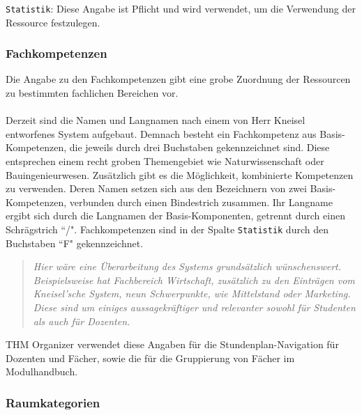 \noindent
\texttt{Statistik}: Diese Angabe ist Pflicht und wird verwendet, um die Verwendung der Ressource festzulegen.\\

\vspace{9pt}

\subsubsection{Fachkompetenzen}
\label{subsec:fachkompetenzen}

Die Angabe zu den Fachkompetenzen gibt eine grobe Zuordnung der Ressourcen zu bestimmten fachlichen Bereichen vor.\\
\\
Derzeit sind die Namen und Langnamen nach einem von Herr Kneisel entworfenes System aufgebaut. Demnach besteht ein Fachkompetenz aus Basis-Kompetenzen, die jeweils durch drei Buchstaben gekennzeichnet sind. Diese entsprechen einem recht groben Themengebiet wie Naturwissenschaft oder Bauingenieurwesen. Zusätzlich gibt es die Möglichkeit, kombinierte Kompetenzen zu verwenden. Deren Namen setzen sich aus den Bezeichnern von zwei Basis-Kompetenzen, verbunden durch einen Bindestrich zusammen. Ihr Langname ergibt sich durch die Langnamen der Basis-Komponenten, getrennt durch einen Schrägstrich ``/". Fachkompetenzen sind in der Spalte \texttt{Statistik} durch den Buchstaben ``F" \hspace{1pt} gekennzeichnet.\\

\begin{quote}
	\textit{Hier wäre eine Überarbeitung des Systems grundsätzlich wünschenswert. Beispielsweise hat Fachbereich Wirtschaft, zusätzlich zu den Einträgen vom Kneisel'sche System, neun Schwerpunkte, wie Mittelstand oder Marketing. Diese sind um einiges aussagekräftiger und relevanter sowohl für Studenten als auch für Dozenten.}
\end{quote}

\noindent
THM Organizer verwendet diese Angaben für die Stundenplan-Navigation für Dozenten und Fächer, sowie die für die Gruppierung von Fächer im Modulhandbuch.

\subsubsection{Raumkategorien}
\label{subsec:room-category}

